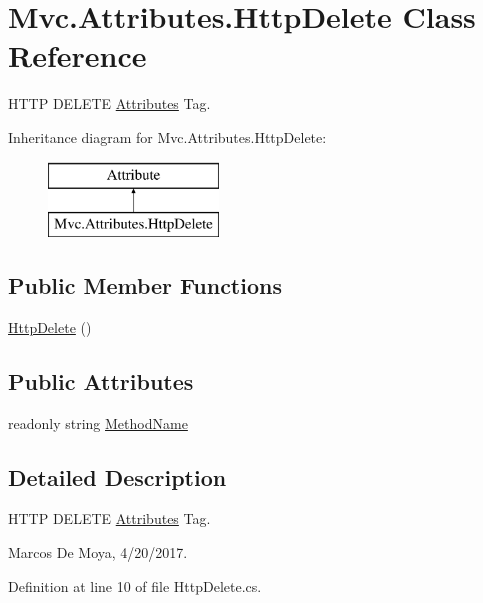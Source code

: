 \hypertarget{class_mvc_1_1_attributes_1_1_http_delete}{}\section{Mvc.\+Attributes.\+Http\+Delete Class Reference}
\label{class_mvc_1_1_attributes_1_1_http_delete}


H\+T\+TP D\+E\+L\+E\+TE \hyperlink{namespace_mvc_1_1_attributes}{Attributes} Tag.  


Inheritance diagram for Mvc.\+Attributes.\+Http\+Delete\+:\begin{figure}[H]
\begin{center}
\leavevmode
\includegraphics[height=2.000000cm]{class_mvc_1_1_attributes_1_1_http_delete}
\end{center}
\end{figure}
\subsection*{Public Member Functions}
\begin{DoxyCompactItemize}
\item 
\hyperlink{class_mvc_1_1_attributes_1_1_http_delete_ad79f2f1f7284e03812dc930e80cf4724}{Http\+Delete} ()
\end{DoxyCompactItemize}
\subsection*{Public Attributes}
\begin{DoxyCompactItemize}
\item 
readonly string \hyperlink{class_mvc_1_1_attributes_1_1_http_delete_ae5e51443f46f5ac296aa709ffce3bb34}{Method\+Name}
\end{DoxyCompactItemize}


\subsection{Detailed Description}
H\+T\+TP D\+E\+L\+E\+TE \hyperlink{namespace_mvc_1_1_attributes}{Attributes} Tag. 

Marcos De Moya, 4/20/2017. 

Definition at line 10 of file Http\+Delete.\+cs.



